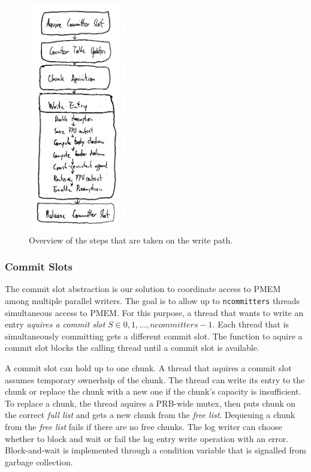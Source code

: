 \documentclass[12pt,a4paper,twoside]{book}
\begin{document}
\begin{figure}[H]
    \centering
    \includegraphics[height=10cm]{fig/prb_writepath_highlevel_activity_diagram}
    \caption{Overview of the steps that are taken on the write path.}
\end{figure}

\subsubsection{Commit Slots}\label{di:prb:write:chunksel}
The commit slot abstraction is our solution to coordinate access to PMEM among multiple parallel writers.
The goal is to allow up to \lstinline{ncommitters} threads simultaneous access to PMEM.
For this purpose, a thread that wants to write an entry \textit{aquires a commit slot} $S \in {0, 1, \dots, ncommitters-1}$.
Each thread that is simultaneously committing gets a different commit slot.
The function to aquire a commit slot blocks the calling thread until a commit slot is available.

A commit slot can hold up to one chunk.
A thread that aquires a commit slot assumes temporary ownerhsip of the chunk.
The thread can write its entry to the chunk or replace the chunk with a new one if the chunk's capacity is insufficient.
To replace a chunk, the thread aquires a PRB-wide mutex, then puts chunk on the correct \textit{full list} and gets a new chunk from the \textit{free list}.
Dequeuing a chunk from the \textit{free list} fails if there are no free chunks.
The log writer can choose whether to block and wait or fail the log entry write operation with an error.
Block-and-wait is implemented through a condition variable that is signalled from garbage collection.
\end{document}
